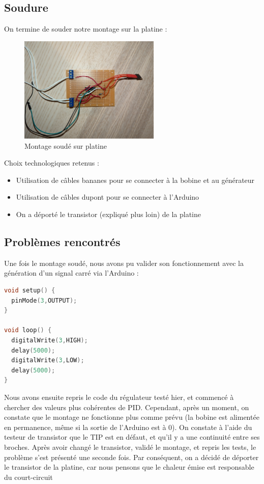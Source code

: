 \documentclass[11pt,a4paper]{article}
\begin{document}
\subsection{Soudure}
On termine de souder notre montage sur la platine :
\begin{figure} [H]
\begin{center}
\includegraphics[width=0.6\textwidth]{Schémas/Montage soudé.jpg} 
\end{center}
\caption{Montage soudé sur platine}
\end{figure}

Choix technologiques retenus :
\begin{itemize}
\item Utilisation de câbles bananes pour se connecter à la bobine et au générateur
\item Utilisation de câbles dupont pour se connecter à l'Arduino
\item On a déporté le transistor (expliqué plus loin) de la platine
\end{itemize}

\subsection{Problèmes rencontrés}
Une fois le montage soudé, nous avons pu valider son fonctionnement avec la génération d'un signal carré via l'Arduino :
\begin{lstlisting}[language = C]
void setup() {
  pinMode(3,OUTPUT);
}

void loop() {
  digitalWrite(3,HIGH);
  delay(5000);
  digitalWrite(3,LOW);
  delay(5000);
}
\end{lstlisting}

Nous avons ensuite repris le code du régulateur testé hier, et commencé à chercher des valeurs plus cohérentes de PID. Cependant, après un moment, on constate que le montage ne fonctionne plus comme prévu (la bobine est alimentée en permanence, même si la sortie de l'Arduino est à 0). On constate à l'aide du testeur de transistor que le TIP est en défaut, et qu'il y a une continuité entre ses broches. Après avoir changé le transistor, validé le montage, et repris les tests, le problème s'est présenté une seconde fois. Par conséquent, on a décidé de déporter le transistor de la platine, car nous pensons que le chaleur émise est responsable du court-circuit
\end{document}
